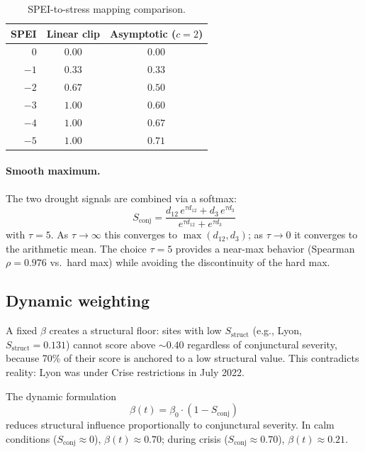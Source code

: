 \documentclass[11pt,a4paper]{article}
\begin{document}
\begin{table}[h]
\centering
\small
\caption{SPEI-to-stress mapping comparison.}
\label{tab:mapping}
\begin{tabular}{rcc}
\toprule
SPEI & Linear clip & Asymptotic ($c=2$) \\
\midrule
$0$   & $0.00$         & $0.00$ \\
$-1$  & $0.33$         & $0.33$ \\
$-2$  & $0.67$         & $0.50$ \\
$-3$  & $\mathbf{1.00}$ & $0.60$ \\
$-4$  & $\mathbf{1.00}$ & $0.67$ \\
$-5$  & $\mathbf{1.00}$ & $0.71$ \\
\bottomrule
\end{tabular}
\end{table}

\paragraph{Smooth maximum.} The two drought signals are combined via a softmax:
\begin{equation}
S_{\text{conj}} = \frac{d_{12}\, e^{\tau d_{12}} + d_3\, e^{\tau d_3}}{e^{\tau d_{12}} + e^{\tau d_3}}
\label{eq:softmax}
\end{equation}
with $\tau = 5$. As $\tau \to \infty$ this converges to $\max(d_{12}, d_3)$; as $\tau \to 0$ it converges to the arithmetic mean. The choice $\tau = 5$ provides a near-max behavior (Spearman $\rho = 0.976$ vs.\ hard max) while avoiding the discontinuity of the hard max.

\subsection{Dynamic weighting}

A fixed $\beta$ creates a structural floor: sites with low $S_{\text{struct}}$ (e.g., Lyon, $S_{\text{struct}} = 0.131$) cannot score above $\sim\!0.40$ regardless of conjunctural severity, because 70\% of their score is anchored to a low structural value. This contradicts reality: Lyon was under Crise restrictions in July 2022.

The dynamic formulation
\begin{equation}
\beta(t) = \beta_0 \cdot (1 - S_{\text{conj}})
\label{eq:beta}
\end{equation}
reduces structural influence proportionally to conjunctural severity. In calm conditions ($S_{\text{conj}} \approx 0$), $\beta(t) \approx 0.70$; during crisis ($S_{\text{conj}} \approx 0.70$), $\beta(t) \approx 0.21$.
\end{document}
